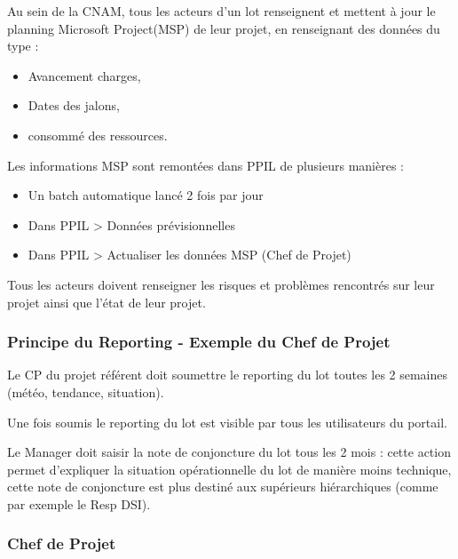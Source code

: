 Au sein de la CNAM, tous les acteurs d’un lot renseignent et mettent à jour le planning Microsoft Project(MSP) de leur projet, en renseignant des données du type :

\vspace{1\baselineskip}

\begin{itemize}
    \item Avancement charges, 
    \item Dates des jalons, 
    \item consommé des ressources.
\end{itemize}

\vspace{1\baselineskip}

Les informations MSP sont remontées dans PPIL de plusieurs manières :
\begin{itemize}
    \item Un batch automatique lancé 2 fois par jour
    \item Dans PPIL > Données prévisionnelles
    \item Dans PPIL > Actualiser les données MSP (Chef de Projet)
\end{itemize}

\vspace{1\baselineskip}

Tous les acteurs doivent renseigner les risques et problèmes rencontrés sur leur projet ainsi que l'état de leur projet.

\subsubsection{Principe du Reporting - Exemple du Chef de Projet}
Le CP du projet référent doit soumettre le reporting du lot toutes les 2 semaines (météo, tendance, situation).

Une fois soumis le reporting du lot est visible par tous les utilisateurs du portail.

Le Manager doit saisir la note de conjoncture du lot tous les 2 mois : cette action permet d'expliquer la situation opérationnelle du lot de manière moins technique, cette note de conjoncture est plus destiné aux supérieurs hiérarchiques (comme par exemple le Resp DSI).

\subsubsection{Chef de Projet}

